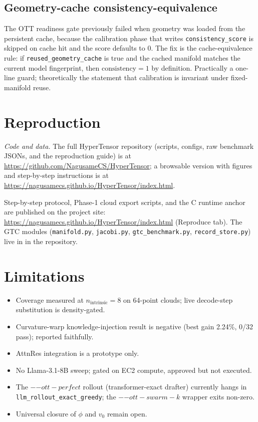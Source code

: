 \documentclass[11pt]{article}
\begin{document}
\subsection{Geometry-cache consistency-equivalence}

The OTT readiness gate previously failed when geometry was loaded from the
persistent cache, because the calibration phase that writes
\texttt{consistency\_score} is skipped on cache hit and the score defaults to
0. The fix is the cache-equivalence rule: if \texttt{reused\_geometry\_cache}
is true and the cached manifold matches the current model fingerprint, then
$\text{consistency}=1$ by definition. Practically a one-line guard;
theoretically the statement that calibration is invariant under fixed-manifold
reuse.


\section{Reproduction}
\smallskip\noindent\textit{Code and data.} The full HyperTensor repository (scripts, configs, raw benchmark JSONs, and the reproduction guide) is at \url{https://github.com/NagusameCS/HyperTensor}; a browsable version with figures and step-by-step instructions is at \url{https://nagusamecs.github.io/HyperTensor/index.html}.

Step-by-step protocol, Phase-1 cloud export scripts, and the C runtime
anchor are published on the project site:
\url{https://nagusamecs.github.io/HyperTensor/index.html} (Reproduce tab).
The GTC modules (\texttt{manifold.py}, \texttt{jacobi.py},
\texttt{gtc\_benchmark.py}, \texttt{record\_store.py}) live in
 in the repository.

\section{Limitations}

\begin{itemize}
  \item Coverage measured at $n_{\mathrm{intrinsic}}=8$ on 64-point clouds;
        live decode-step substitution is density-gated.
  \item Curvature-warp knowledge-injection result is negative (best
        gain 2.24\%, 0/32 pass); reported faithfully.
  \item AttnRes integration is a prototype only.
  \item No Llama-3.1-8B sweep; gated on EC2 compute, approved but not
        executed.
  \item The $-{-ott-perfect}$ rollout (transformer-exact drafter)
        currently hangs in \texttt{llm\_rollout\_exact\_greedy}; the
        $-{-ott-swarm-k}$ wrapper exits non-zero.
  \item Universal closure of $\phi$ and $v_0$ remain open.
\end{itemize}
\end{document}
